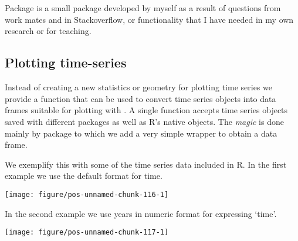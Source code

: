 \documentclass[paper=a4,10pt,div=17,headsepline,BCOR=12mm,twoside,open=right]{scrbook}\usepackage{knitr}
\begin{document}
\section[ggpmisc]{\ggpmisc}

Package \ggpmisc is a small package developed by myself as a result of questions from work mates and in Stackoverflow, or functionality that I have needed in my own research or for teaching.

\subsection{Plotting time-series}

Instead of creating a new statistics or geometry for plotting time series we provide a function that can be used to convert time series objects into data frames suitable for plotting with \ggplot. A single function  accepts time series objects saved with different packages as well as R's native  objects. The \textit{magic} is done mainly by package \xts to which we add a very simple wrapper to obtain a data frame.

We exemplify this with some of the time series data included in R. In the first example we use the default format for time.

\begin{knitrout}\footnotesize
{}\color{fgcolor}\begin{kframe}
\begin{alltt}
\hlstd{(}
        \hlopt{+}
  \hlstd{()}
\end{alltt}
\end{kframe}

{\centering \texttt{[image: figure/pos-unnamed-chunk-116-1]} 

}



\end{knitrout}

In the second example we use years in numeric format for expressing `time'.

\begin{knitrout}\footnotesize
{}\color{fgcolor}\begin{kframe}
\begin{alltt}
\hlstd{(} \hlstd{,}  \hlstd{=} \hlstd{),}
       \hlstd{(}    \hlopt{+}
  \hlstd{()}
\end{alltt}
\end{kframe}

{\centering \texttt{[image: figure/pos-unnamed-chunk-117-1]} 

}



\end{knitrout}
\end{document}

